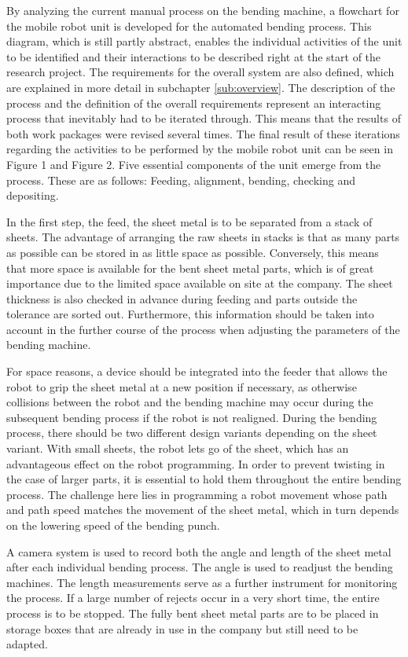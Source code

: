 By analyzing the current manual process on the bending machine, a flowchart for the mobile robot unit
is developed for the automated bending process. This
diagram, which is still partly abstract, enables the individual activities of the unit to be identified and
their interactions to be described right at the start of the research project. The requirements for the
overall system are also defined, which are explained in more detail
in subchapter \ref{sub:overview}. The description of the process and the definition of the overall requirements
represent an interacting process that inevitably had to be iterated through. This means that the results
of both work packages were revised several times. The final result of these iterations regarding the
activities to be performed by the mobile robot unit can be seen in Figure 1 and Figure 2. Five essential
components of the unit emerge from the process. These are as follows: Feeding, alignment, bending,
checking and depositing.

In the first step, the feed, the sheet metal is to be separated from a stack of sheets. The advantage of
arranging the raw sheets in stacks is that as many parts as possible can be stored in as little space as
possible. Conversely, this means that more space is available for the bent sheet metal parts, which is
of great importance due to the limited space available on site at the company. The sheet thickness is
also checked in advance during feeding and parts outside the tolerance are sorted out. Furthermore,
this information should be taken into account in the further course of the process when adjusting the
parameters of the bending machine.

For space reasons, a device should be integrated into the feeder that allows the robot to grip the sheet
metal at a new position if necessary, as otherwise collisions between the robot and the bending
machine may occur during the subsequent bending process if the robot is not realigned.
During the bending process, there should be two different design variants depending on the sheet
variant. With small sheets, the robot lets go of the sheet, which has an advantageous effect on the
robot programming. In order to prevent twisting in the case of larger parts, it is essential to hold them
throughout the entire bending process. The challenge here lies in programming a robot movement
whose path and path speed matches the movement of the sheet metal, which in turn depends on the
lowering speed of the bending punch.

A camera system is used to record both the angle and length of the sheet metal after each individual
bending process. The angle is used to readjust the bending machines. The length measurements
serve as a further instrument for monitoring the process. If a large number of rejects occur in a very
short time, the entire process is to be stopped.
The fully bent sheet metal parts are to be placed in storage boxes that are already in use in the
company but still need to be adapted.

